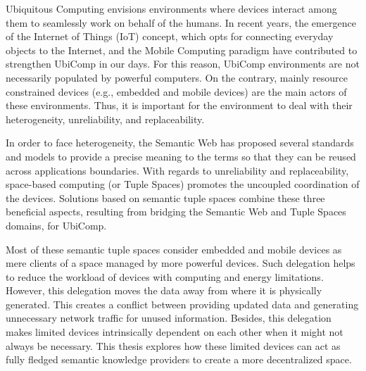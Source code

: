 




\begin{abstracts}        %
Ubiquitous Computing envisions environments where devices interact among them to seamlessly work on behalf of the humans.
In recent years, the emergence of the Internet of Things (IoT) concept, which opts for connecting everyday objects to the Internet, and the Mobile Computing paradigm have contributed to strengthen UbiComp in our days.
For this reason, UbiComp environments are not necessarily populated by powerful computers.
On the contrary, mainly resource constrained devices (e.g., embedded and mobile devices) are the main actors of these environments.
Thus, it is important for the environment to deal with their heterogeneity, unreliability, and replaceability.


In order to face heterogeneity, the Semantic Web has proposed several standards and models to provide a precise meaning to the terms so that they can be reused across applications boundaries.
With regards to unreliability and replaceability, space-based computing (or Tuple Spaces) promotes the uncoupled coordination of the devices.
Solutions based on semantic tuple spaces combine these three beneficial aspects, resulting from bridging the Semantic Web and Tuple Spaces domains, for UbiComp.

Most of these semantic tuple spaces consider embedded and mobile devices as mere clients of a space managed by more powerful devices.
Such delegation helps to reduce the workload of devices with computing and energy limitations.
However,  this delegation moves the data away from where it is physically generated.
This creates a conflict between providing updated data and generating unnecessary network traffic for unused information.
Besides, this delegation makes limited devices intrinsically dependent on each other when it might not always be necessary.
This thesis explores how these limited devices can act as fully fledged semantic knowledge providers to create a more decentralized space.


\end{abstracts}

